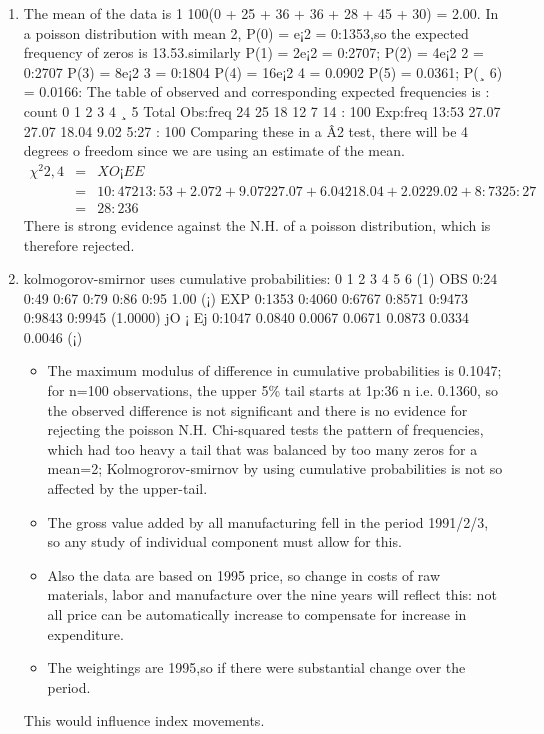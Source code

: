 \documentclass[a4paper,12pt]{article}
\begin{document}
\begin{enumerate}
    \item 
The mean of the data is 1
100(0 + 25 + 36 + 36 + 28 + 45 + 30) = 2.00. In a
poisson distribution with mean 2, P(0) = e¡2 = 0:1353,so the expected frequency of
zeros is 13.53.similarly P(1) = 2e¡2 = 0:2707; P(2) = 4e¡2
2 = 0:2707 P(3) = 8e¡2
3 =
0:1804 P(4) = 16e¡2
4 = 0.0902 P(5) = 0.0361; P(¸ 6) = 0.0166: The table of observed
and corresponding expected frequencies is :
count 0 1 2 3 4 ¸ 5 Total
Obs:freq 24 25 18 12 7 14 : 100
Exp:freq 13:53 27.07 27.07 18.04 9.02 5:27 : 100
Comparing these in a Â2 test, there will be 4 degrees o freedom since we are using an
estimate of the mean.
\begin{eqnarray*}
\chi^2{2,4}
&=&
XO ¡ E
E
\\ &=& 
10:472
13:53
+
2.072 + 9.072
27.07
+
6.042
18.04
+
2.022
9.02
+
8:732
5:27
\\ &=& 28:236
\end{eqnarray*}
There is strong evidence against the N.H. of a poisson distribution, which is therefore
rejected.
\item kolmogorov-smirnor uses cumulative probabilities:
0 1 2 3 4 5 6 (1)
OBS 0:24 0:49 0:67 0:79 0:86 0:95 1.00 (¡)
EXP 0:1353 0:4060 0:6767 0:8571 0:9473 0:9843 0:9945 (1.0000)
jO ¡ Ej 0:1047 0.0840 0.0067 0.0671 0.0873 0.0334 0.0046 (¡)
\begin{itemize}
    \item The maximum modulus of difference in cumulative probabilities is 0.1047; for n=100
observations, the upper 5\% tail starts at 1p:36
n i.e. 0.1360, so the observed difference is
not significant and there is no evidence for rejecting the poisson N.H. Chi-squared tests
the pattern of frequencies, which had too heavy a tail that was balanced by too many
zeros for a mean=2; Kolmogrorov-smirnov by using cumulative probabilities is not so
affected by the upper-tail.
\item The gross value added by all manufacturing fell in the period 1991/2/3, so any study
of individual component must allow for this. 
\item Also the data are based on 1995 price, so
change in costs of raw materials, labor and manufacture over the nine years will reflect
this: not all price can be automatically increase to compensate for increase in expenditure.
\item The weightings are 1995,so if there were substantial change over the period.
\end{itemize}
 This
would influence index movements.

\end{enumerate}
\end{document}
